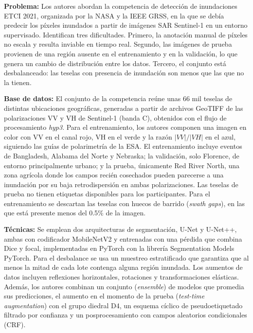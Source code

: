 \documentclass[conference]{IEEEtran}
\begin{document}
\textbf{Problema:} Los autores abordan la competencia de detección de inundaciones ETCI 2021, organizada por la NASA y la IEEE GRSS, en la que se debía predecir los píxeles inundados a partir de imágenes SAR Sentinel-1 en un entorno supervisado. Identifican tres dificultades. Primero, la anotación manual de píxeles no escala y resulta inviable en tiempo real. Segundo, las imágenes de prueba provienen de una región ausente en el entrenamiento y en la validación, lo que genera un cambio de distribución entre los datos. Tercero, el conjunto está desbalanceado: las teselas con presencia de inundación son menos que las que no la tienen.
 
\textbf{Base de datos:} El conjunto de la competencia reúne unas 66 mil teselas de distintas ubicaciones geográficas, generadas a partir de archivos GeoTIFF de las polarizaciones VV y VH de Sentinel-1 (banda C), obtenidos con el flujo de procesamiento \textit{hyp3}. Para el entrenamiento, los autores componen una imagen en color con VV en el canal rojo, VH en el verde y la razón $|VV|/|VH|$ en el azul, siguiendo las guías de polarimetría de la ESA. El entrenamiento incluye eventos de Bangladesh, Alabama del Norte y Nebraska; la validación, solo Florence, de entorno principalmente urbano; y la prueba, únicamente Red River North, una zona agrícola donde los campos recién cosechados pueden parecerse a una inundación por su baja retrodispersión en ambas polarizaciones. Las teselas de prueba no tienen etiquetas disponibles para los participantes. Para el entrenamiento se descartan las teselas con huecos de barrido (\textit{swath gaps}), en las que está presente menos del 0.5\% de la imagen.
 
\textbf{Técnicas:} Se emplean dos arquitecturas de segmentación, U-Net y U-Net++, ambas con codificador MobileNetV2 y entrenadas con una pérdida que combina Dice y focal, implementadas en PyTorch con la librería Segmentation Models PyTorch. Para el desbalance se usa un muestreo estratificado que garantiza que al menos la mitad de cada lote contenga alguna región inundada. Los aumentos de datos incluyen reflexiones horizontales, rotaciones y transformaciones elásticas. Además, los autores combinan un conjunto (\textit{ensemble}) de modelos que promedia sus predicciones, el aumento en el momento de la prueba (\textit{test-time augmentation}) con el grupo diedral D4, un esquema cíclico de pseudoetiquetado filtrado por confianza y un posprocesamiento con campos aleatorios condicionales (CRF).
 
\end{document}
